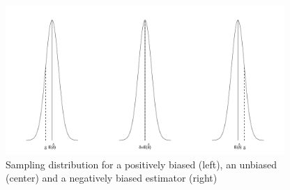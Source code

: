 \documentclass[
  english,
  man]{apa6}
\begin{document}
\begin{figure}
\includegraphics[width=400px]{chp4_files/figure-latex/BIAS-1} \caption{Sampling distribution for a positively biased (left), an unbiased (center) and a negatively biased estimator (right)}\label{fig:BIAS}
\end{figure}
\end{document}
